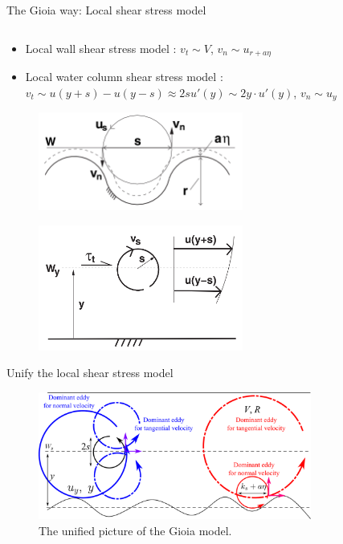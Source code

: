 \documentclass[10pt,xcolor={table,dvipsnames},t]{beamer}
\begin{document}
\begin{frame}{The Gioia way: Local shear stress model}
\begin{columns}
    \end{columns}
    \begin{itemize}
        \item Local wall shear stress model \cite{gioiaFriction2006}: $v_t \sim V$, $v_n\sim u_{r+a\eta}$
        \item Local water column shear stress model \cite{gioiaMVP2010}: $v_t\sim u(y+s) - u(y-s)\approx 2s u'(y) \sim 2y\cdot u'(y)$, $v_n \sim u_y$
    \end{itemize}
    \begin{figure}[!htb]
        \centering
        \begin{minipage}{.5\textwidth}
            \centering
            \includegraphics[width=0.6\textwidth]{./figures/wall-shear.png}
            \label{fig:wall-shear}
        \end{minipage}%
        \begin{minipage}{0.5\textwidth}
            \centering
            \includegraphics[width=0.6\textwidth]{./figures/column-shear.png}
            \label{fig:column-shear}
        \end{minipage}
    \end{figure}
\end{frame}

\begin{frame}{Unify the local shear stress model}
    \begin{figure}[htpb]
        \centering
        \includegraphics[width=0.8\textwidth]{./figures/unify-gioia-model.pdf}
        \caption{The unified picture of the Gioia model.}
        \label{fig:-figures-unify-gioia-model-pdf}
    \end{figure}
\end{frame}
\end{document}
